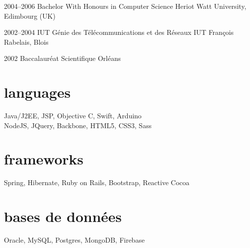 \documentclass[hidelinks]{friggeri-cv} %
\begin{document}
\begin{entrylist}
\entry
{2004--2006}
{Bachelor With Honours {\normalfont in Computer Science}}
{Heriot Watt University, Edimbourg (UK)}

\entry
{2002--2004}
{IUT {\normalfont Génie des Télécommunications et des Réseaux}}
{IUT François Rabelais, Blois}

\entry
{2002}
{Baccalauréat {\normalfont Scientifique}}
{Orléans}

\end{entrylist}


\section{languages}

Java/J2EE, JSP, Objective C, Swift, Arduino\\ NodeJS, JQuery, Backbone, HTML5, CSS3, Sass


\section{frameworks}

Spring, Hibernate, Ruby on Rails, Bootstrap, Reactive Cocoa


\section{bases de données}

Oracle, MySQL, Postgres, MongoDB, Firebase

\end{document}
